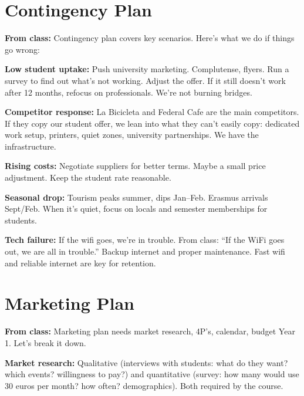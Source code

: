 \documentclass[12pt,a4paper]{article}
\begin{document}
\vspace{0.5em}
\noindent{\color{sectionblue}\rule{\textwidth}{0.4pt}}

\section*{\color{sectionblue}Contingency Plan}\label{sec:contingency}

\textbf{From class:} Contingency plan covers key scenarios. Here's what we do if things go wrong:

\textbf{\textcolor{cafebrown}{Low student uptake:}} Push university marketing. Complutense, flyers. Run a survey to find out what's not working. Adjust the offer. If it still doesn't work after 12 months, refocus on professionals. We're not burning bridges.

\textbf{\textcolor{cafebrown}{Competitor response:}} La Bicicleta and Federal Cafe are the main competitors. If they copy our student offer, we lean into what they can't easily copy: dedicated work setup, printers, quiet zones, university partnerships. We have the infrastructure.

\textbf{\textcolor{cafebrown}{Rising costs:}} Negotiate suppliers for better terms. Maybe a small price adjustment. Keep the student rate reasonable.

\textbf{\textcolor{cafebrown}{Seasonal drop:}} Tourism peaks summer, dips Jan--Feb. Erasmus arrivals Sept/Feb. When it's quiet, focus on locals and semester memberships for students.

\textbf{\textcolor{cafebrown}{Tech failure:}} If the wifi goes, we're in trouble. From class: ``If the WiFi goes out, we are all in trouble.'' Backup internet and proper maintenance. Fast wifi and reliable internet are key for retention.

\vspace{0.5em}
\noindent{\color{sectionblue}\rule{\textwidth}{0.4pt}}

\section*{\color{sectionblue}Marketing Plan}\label{sec:marketing}

\textbf{From class:} Marketing plan needs market research, 4P's, calendar, budget Year 1. Let's break it down.

\textbf{\textcolor{cafebrown}{Market research:}} Qualitative (interviews with students: what do they want? which events? willingness to pay?) and quantitative (survey: how many would use 30 euros per month? how often? demographics). Both required by the course.
\end{document}
